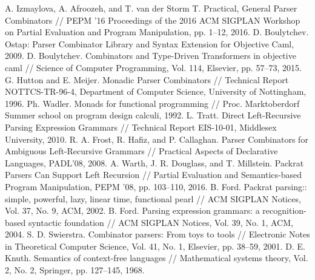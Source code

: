 \documentclass[conference]{IEEEtran}
\begin{document}
\begin{thebibliography}{00}
 A. Izmaylova, A. Afroozeh, and T. van der Storm T. Practical, General Parser Combinators // PEPM '16 Proceedings of the 2016 ACM SIGPLAN Workshop on Partial Evaluation and Program Manipulation, pp. 1--12, 2016.
 D. Boulytchev. Ostap: Parser Combinator Library and Syntax Extension for Objective Caml, 2009.
 D. Boulytchev. Combinators and Type-Driven Transformers in objective caml // Science of Computer Programming, Vol. 114, Elsevier, pp. 57--73, 2015.
 G. Hutton and E. Meijer. Monadic Parser Combinators // Technical Report NOTTCS-TR-96-4, Department of Computer Science, University of Nottingham, 1996.
 Ph. Wadler. Monads for functional programming // Proc. Marktoberdorf Summer school on program design calculi, 1992.
 L. Tratt. Direct Left-Recursive Parsing Expression Grammars // Technical Report EIS-10-01, Middlesex University, 2010.
 R. A. Frost, R. Hafiz, and P. Callaghan. Parser Combinators for Ambiguous Left-Recursive Grammars // Practical Aspects of Declarative Languages, PADL’08, 2008.
 A. Warth, J. R. Douglass, and T. Millstein. Packrat Parsers Can Support Left Recursion // Partial Evaluation and Semantics-based Program Manipulation, PEPM ’08, pp. 103--110, 2016.
 B. Ford. Packrat parsing:: simple, powerful, lazy, linear time, functional pearl // ACM SIGPLAN Notices, Vol. 37, No. 9, ACM, 2002.
 B. Ford. Parsing expression grammars: a recognition-based syntactic foundation // ACM SIGPLAN Notices, Vol. 39, No. 1, ACM, 2004.
 S. D. Swierstra. Combinator parsers: From toys to tools // Electronic Notes in Theoretical Computer Science, Vol. 41, No. 1, Elsevier, pp. 38--59, 2001.
 D. E. Knuth. Semantics of context-free languages // Mathematical systems theory, Vol. 2, No. 2, Springer, pp. 127--145, 1968.

\end{thebibliography}
\end{document}
